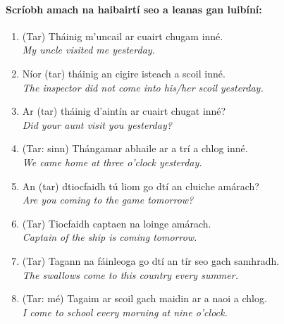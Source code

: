 \documentclass[article,a4paper,oneside,12pt]{memoir}
\begin{document}
\clearpage

\paragraph{Scríobh amach na haibairtí seo a leanas gan luibíní:}

\begin{enumerate}
  \item (Tar) Tháinig m'uncail ar cuairt chugam inn\'{e}.\\
    	\emph{My uncle visited me yesterday.}
  \item Níor (tar) tháinig an cigire isteach a scoil inn\'{e}.\\
    	\emph{The inspector did not come into his/her scoil yesterday.}
  \item Ar (tar) tháinig d'aintín ar cuairt chugat inn\'{e}?\\
    	\emph{Did your aunt visit you yesterday?}
  \item (Tar: sinn) Thángamar abhaile ar a trí a chlog inn\'{e}.\\
    	\emph{We came home at three o'clock yesterday.}
  \item An (tar) dtiocfaidh tú liom go dtí an cluiche amárach?\\
    	\emph{Are you coming to the game tomorrow?}
  \item (Tar) Tiocfaidh captaen na loinge amárach.\\
	\emph{Captain of the ship is coming tomorrow.}
  \item (Tar) Tagann na fáinleoga go dtí an tír seo gach samhradh.\\
	\emph{The swallows come to this country every summer.}
  \item (Tar: m\'{e}) Tagaim ar scoil gach maidin ar a naoi a chlog.\\
	\emph{I come to school every morning at nine o'clock.}
\end{enumerate}
\end{document}
